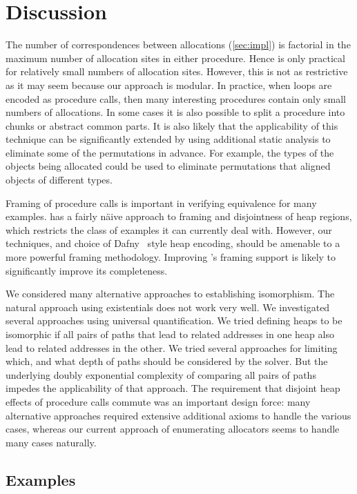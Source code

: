 \documentclass[runningheads,a4paper]{llncs}
\begin{document}
\section{Discussion}\label{sec:discussion}

The number of correspondences between allocations (\cref{sec:impl}) is factorial in the maximum number of allocation sites in either procedure. Hence \metho{} is only practical for relatively small numbers of allocation sites. However, this is not as restrictive as it may seem because our approach is modular. In practice, when loops are encoded as procedure calls, then many interesting procedures contain only small numbers of allocations. In some cases it is also possible to split a procedure into chunks or abstract common parts. It is also likely that the applicability of this technique can be significantly extended by using additional static analysis to eliminate some of the permutations in advance. For example, the types of the objects being allocated could be used to eliminate permutations that aligned objects of different types.

Framing of procedure calls is important in verifying equivalence for many examples. \Tool{} has a fairly n{\"a}ive approach to framing and disjointness of heap regions, which restricts the class of examples it can currently deal with. However, our techniques, and choice of Dafny~\cite{Leino10} style heap encoding, should be amenable to a more powerful framing methodology. Improving \tool{}'s framing support is likely to significantly improve its completeness.

We considered many alternative approaches to establishing isomorphism. The natural approach using existentials does not work very well. We investigated several approaches using universal quantification. We tried defining heaps to be isomorphic if all pairs of paths that lead to related addresses in one heap also lead to related addresses in the other. We tried several approaches for limiting which, and what depth of paths should be considered by the solver. But the underlying doubly exponential complexity of comparing all pairs of paths impedes the applicability of that approach. The requirement that disjoint heap effects of procedure calls commute was an important design force: many alternative approaches required extensive additional axioms to handle the various cases, whereas our current approach of enumerating allocators seems to handle many cases naturally.

\subsection{Examples}
\end{document}

